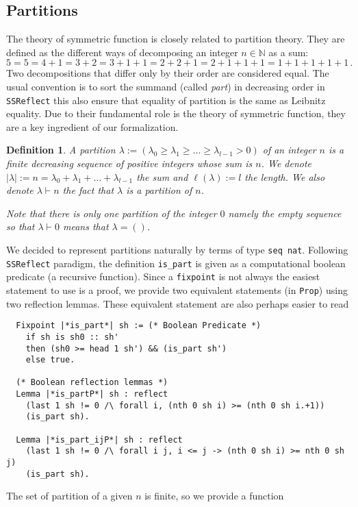 \documentclass[12pt,a4paper]{article}
\newcommand{\SSR}{\texttt{SSReflect}\xspace}
\newcommand{\N}{{\mathbb N}}
\newcommand{\partof}{\vdash}                    %
\newtheorem{DEFN}{Definition}
\begin{document}
\subsection{Partitions}

The theory of symmetric function is closely related to partition theory. They
are defined as the different ways of decomposing an integer $n\in\N$ as a sum:
\[ 5=5=4+1=3+2=3+1+1=2+2+1=2+1+1+1=1+1+1+1+1\,. \] Two decompositions that
differ only by their order are considered equal. The usual convention is to
sort the summand (called \emph{part}) in decreasing order in \SSR this also
ensure that equality of partition is the same as Leibnitz equality. Due to
their fundamental role is the theory of symmetric function, they are a key
ingredient of our formalization.

\begin{DEFN}
  A \emph{partition} $\lambda :=
  (\lambda_0\geq\lambda_1\geq\dots\geq\lambda_{l-1} > 0)$ of an integer $n$ is
  a finite decreasing sequence of positive integers whose sum is $n$. We
  denote $|\lambda| := n = \lambda_0+\lambda_1+\dots+\lambda_{l-1}$ the sum
  and $\ell(\lambda) := l$ the length. We also denote $\lambda\partof n$ the
  fact that $\lambda$ is a partition of $n$.

  Note that there is only one partition of the integer $0$ namely the empty
  sequence so that $\lambda\partof0$ means that $\lambda = ()$.
\end{DEFN}
We decided to represent partitions naturally by terms of type 
\lstinline+seq nat+. 
Following \SSR paradigm, the definition \lstinline|is_part| is given as
a computational boolean predicate (a recursive function). Since a
\lstinline{fixpoint} is not always the easiest statement to use is a proof, we
provide two equivalent statements (in \lstinline|Prop|) using two reflection
lemmas. These equivalent statement are also perhaps easier to read
\begin{lstlisting}
  Fixpoint |*is_part*| sh := (* Boolean Predicate *)
    if sh is sh0 :: sh'
    then (sh0 >= head 1 sh') && (is_part sh')
    else true.

  (* Boolean reflection lemmas *)
  Lemma |*is_partP*| sh : reflect
    (last 1 sh != 0 /\ forall i, (nth 0 sh i) >= (nth 0 sh i.+1))
    (is_part sh).

  Lemma |*is_part_ijP*| sh : reflect
    (last 1 sh != 0 /\ forall i j, i <= j -> (nth 0 sh i) >= nth 0 sh j) 
    (is_part sh).
\end{lstlisting}
The set of partition of a given $n$ is finite, so we provide a function
\end{document}
